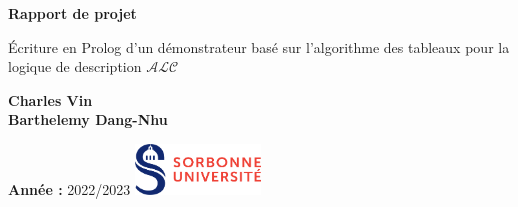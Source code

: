 \documentclass[12pt]{article}
\begin{document}
\begin{titlepage}
    \begin{center}
        \vspace*{1cm}

        \Huge
        \textbf{Rapport de projet}

        \vspace{0.5cm}
        \LARGE
        Écriture en Prolog d'un démonstrateur basé sur l'algorithme des tableaux pour la logique de description  $ \mathcal{ALC}$

        \vspace{1.5cm}

        \textbf{Charles Vin}\\
        \textbf{Barthelemy Dang-Nhu}

        \vfill



        \normalsize

        \textbf{Année :}
        2022/2023
        \hfill
        \includegraphics[width=0.25\textwidth]{./src/logo.png}
    \end{center}
\end{titlepage}

\tableofcontents
\newpage
\end{document}
